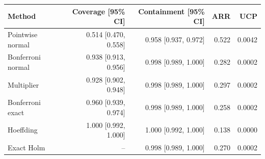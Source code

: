 \begin{tabular}{lrrrr}
\toprule
Method & Coverage [95\% CI] & Containment [95\% CI] & ARR & UCP \\
\midrule
Pointwise normal & 0.514 [0.470, 0.558] & 0.958 [0.937, 0.972] & 0.522 & 0.0042 \\
Bonferroni normal & 0.938 [0.913, 0.956] & 0.998 [0.989, 1.000] & 0.282 & 0.0002 \\
Multiplier & 0.928 [0.902, 0.948] & 0.998 [0.989, 1.000] & 0.297 & 0.0002 \\
Bonferroni exact & 0.960 [0.939, 0.974] & 0.998 [0.989, 1.000] & 0.258 & 0.0002 \\
Hoeffding & 1.000 [0.992, 1.000] & 1.000 [0.992, 1.000] & 0.138 & 0.0000 \\
Exact Holm & -- & 0.998 [0.989, 1.000] & 0.270 & 0.0002 \\
\bottomrule
\end{tabular}
